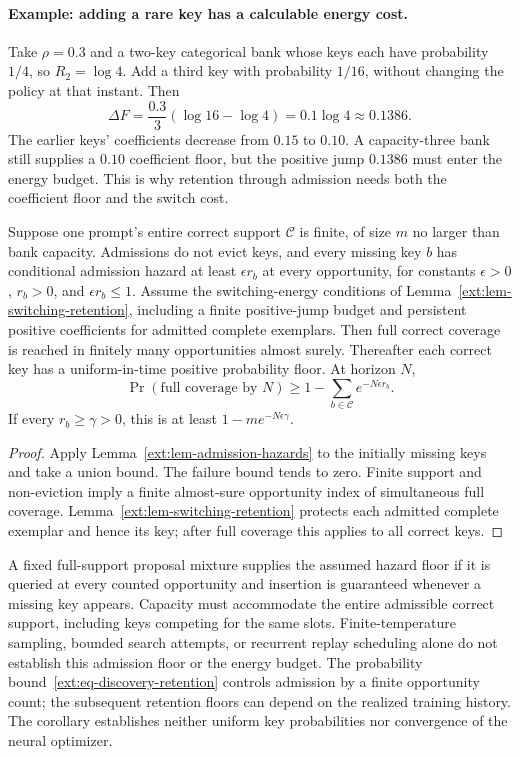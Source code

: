 \paragraph{Example: adding a rare key has a calculable energy cost.}
Take $\rho=0.3$ and a two-key categorical bank whose keys each have
probability $1/4$, so $R_2=\log4$. Add a third key with probability $1/16$,
without changing the policy at that instant. Then
\[
 \Delta F=\frac{0.3}{3}(\log16-\log4)
          =0.1\log4\approx0.1386.
\]
The earlier keys' coefficients decrease from $0.15$ to $0.10$. A
capacity-three bank still supplies a $0.10$ coefficient floor, but the
positive jump $0.1386$ must enter the energy budget. This is why retention
through admission needs both the coefficient floor and the switch cost.

\begin{corollary}
\label{ext:cor-discovery-retention}
Suppose one prompt's entire correct support $\mathcal C$ is finite, of size
$m$ no larger than bank capacity. Admissions do not evict keys, and every
missing key $b$ has conditional admission hazard at least $\epsilon r_b$ at
every opportunity, for constants $\epsilon>0$, $r_b>0$, and
$\epsilon r_b\le1$. Assume the switching-energy conditions of
Lemma~\ref{ext:lem-switching-retention}, including a finite positive-jump
budget and persistent positive coefficients for admitted complete exemplars.
Then full correct coverage is reached in finitely many opportunities almost
surely. Thereafter each correct key has a uniform-in-time positive
probability floor. At horizon $N$,
\begin{equation}
 \Pr(\text{full coverage by }N)
 \ge 1-\sum_{b\in\mathcal C}e^{-N\epsilon r_b}.
 \label{ext:eq-discovery-retention}
\end{equation}
If every $r_b\ge\gamma>0$, this is at least $1-me^{-N\epsilon\gamma}$.
\end{corollary}
\begin{proof}
Apply Lemma~\ref{ext:lem-admission-hazards} to the initially missing keys and
take a union bound. The failure bound tends to zero. Finite support and
non-eviction imply a finite almost-sure opportunity index of simultaneous
full coverage. Lemma~\ref{ext:lem-switching-retention} protects each admitted
complete exemplar and hence its key; after full coverage this applies to
all correct keys.
\end{proof}

A fixed full-support proposal mixture supplies the assumed hazard floor if
it is queried at every counted opportunity and insertion is guaranteed
whenever a missing key appears. Capacity must accommodate the entire
admissible correct support, including keys competing for the same slots.
Finite-temperature sampling, bounded search attempts, or recurrent replay
scheduling alone do not establish this admission floor or the energy
budget. The probability bound~\eqref{ext:eq-discovery-retention} controls
admission by a finite opportunity count; the subsequent retention floors
can depend on the realized training history. The corollary establishes
neither uniform key probabilities nor convergence of the neural optimizer.

